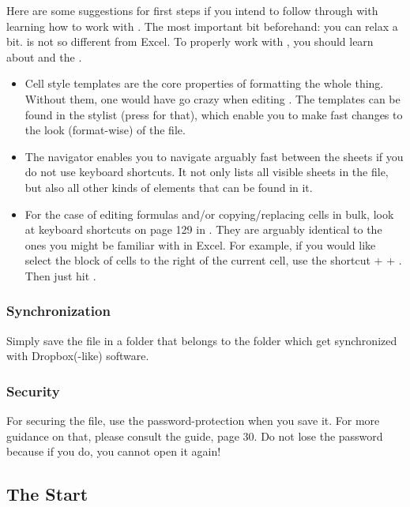 Here are some suggestions for first steps if you intend to follow through with learning how to work with \loc.
The most important bit beforehand: you can relax a bit. \loc is not so different from Excel.
To properly work with \tfn, you should learn about  and the .
\begin{itemize}
	\item Cell style templates are the core properties of formatting the whole thing.
	Without them, one would have go crazy when editing \tfn.
	The templates can be found in the stylist (press  for that), which enable you to make fast changes to the look (format-wise) of the file.
	\item The navigator enables you to navigate arguably fast between the sheets if you do not use keyboard shortcuts.
	It not only lists all visible sheets in the file, but also all other kinds of elements that can be found in it.
	\item For the case of editing formulas and/or copying/replacing cells in bulk, look at keyboard shortcuts on page 129 in .
	They are arguably identical to the ones you might be familiar with in Excel.
	For example, if you would like select the block of cells to the right of the current cell, use the shortcut  +  + \keystroke{\( \rightarrow \)}.
	Then just hit .
\end{itemize}

\subsubsection{Synchronization}
\label{subsubsec:synchronization}

Simply save the file in a folder that belongs to the folder which get synchronized with Dropbox(-like) software.

\subsubsection{Security}
\label{subsubsec:security}

For securing the file, use the password-protection when you save it.
For more guidance on that, please consult the  guide, page 30.
Do not lose the password because if you do, you cannot open it again!

\subsection{The Start}
\label{subsec:opening-the-file}

